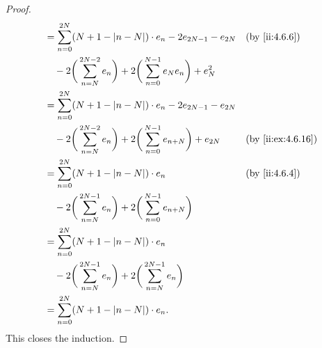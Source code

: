 \begin{proof}
\begin{align*}
     & = \sum_{n = 0}^{2N} (N + 1 - \abs{n - N}) \cdot e_n - 2 e_{2N - 1} - e_{2N}                                       &  & \by{ii:4.6.6}              \\
     & \quad - 2 \bigg(\sum_{n = N}^{2N - 2} e_n\bigg) + 2 \bigg(\sum_{n = 0}^{N - 1} e_N e_n\bigg) + e_N^2                                              \\
     & = \sum_{n = 0}^{2N} (N + 1 - \abs{n - N}) \cdot e_n - 2 e_{2N - 1} - e_{2N}                                                                       \\
     & \quad - 2 \bigg(\sum_{n = N}^{2N - 2} e_n\bigg) + 2 \bigg(\sum_{n = 0}^{N - 1} e_{n + N}\bigg) + e_{2N}           &  & \by{ii:ex:4.6.16}          \\
     & = \sum_{n = 0}^{2N} (N + 1 - \abs{n - N}) \cdot e_n                                                               &  & \by{ii:4.6.4}              \\
     & \quad - 2 \bigg(\sum_{n = N}^{2N - 1} e_n\bigg) + 2 \bigg(\sum_{n = 0}^{N - 1} e_{n + N}\bigg)                                                    \\
     & = \sum_{n = 0}^{2N} (N + 1 - \abs{n - N}) \cdot e_n                                                                                               \\
     & \quad - 2 \bigg(\sum_{n = N}^{2N - 1} e_n\bigg) + 2 \bigg(\sum_{n = N}^{2N - 1} e_n\bigg)                                                         \\
     & = \sum_{n = 0}^{2N} (N + 1 - \abs{n - N}) \cdot e_n.
  \end{align*}
  This closes the induction.


\end{proof}
